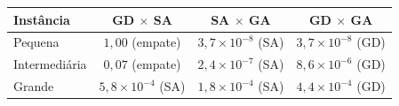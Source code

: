 \begin{tabular}{lccc}
\toprule
Instância & GD $\times$ SA & SA $\times$ GA & GD $\times$ GA \\
\midrule
Pequena & $1{,}00$ (empate) & $3{,}7\times 10^{-8}$ (SA) & $3{,}7\times 10^{-8}$ (GD) \\
Intermediária & $0{,}07$ (empate) & $2{,}4\times 10^{-7}$ (SA) & $8{,}6\times 10^{-6}$ (GD) \\
Grande & $5{,}8\times 10^{-4}$ (SA) & $1{,}8\times 10^{-4}$ (SA) & $4{,}4\times 10^{-4}$ (GD) \\
\bottomrule
\end{tabular}
